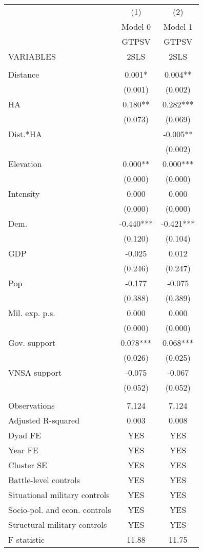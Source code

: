 \documentclass[]{article}
\begin{document}
\begin{tabular}{lcc} \hline
 & (1) & (2) \\
 & Model 0 & Model 1 \\
 & GTPSV & GTPSV \\
VARIABLES & 2SLS & 2SLS \\ \hline
 &  &  \\
Distance & 0.001* & 0.004** \\
 & (0.001) & (0.002) \\
HA & 0.180** & 0.282*** \\
 & (0.073) & (0.069) \\
Dist.*HA &  & -0.005** \\
 &  & (0.002) \\
Elevation & 0.000** & 0.000*** \\
 & (0.000) & (0.000) \\
Intensity & 0.000 & 0.000 \\
 & (0.000) & (0.000) \\
Dem. & -0.440*** & -0.421*** \\
 & (0.120) & (0.104) \\
GDP & -0.025 & 0.012 \\
 & (0.246) & (0.247) \\
Pop & -0.177 & -0.075 \\
 & (0.388) & (0.389) \\
Mil. exp. p.s. & 0.000 & 0.000 \\
 & (0.000) & (0.000) \\
Gov. support & 0.078*** & 0.068*** \\
 & (0.026) & (0.025) \\
VNSA support & -0.075 & -0.067 \\
 & (0.052) & (0.052) \\
 &  &  \\
Observations & 7,124 & 7,124 \\
Adjusted R-squared & 0.003 & 0.008 \\
Dyad FE & YES & YES \\
Year FE & YES & YES \\
Cluster SE & YES & YES \\
Battle-level controls & YES & YES \\
Situational military controls & YES & YES \\
Socio-pol. and econ. controls & YES & YES \\
Structural military controls & YES & YES \\
F statistic & 11.88 & 11.75 \\

\end{tabular}
\end{document}
